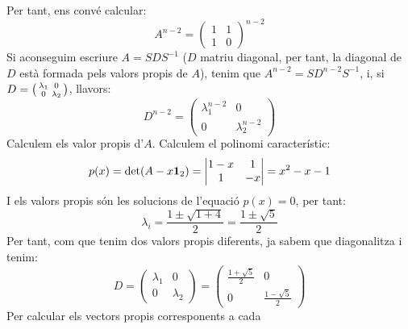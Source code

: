 \documentclass[
  11pt,
]{book}
\numberwithin{dummy}{section}
\theoremstyle{maincolornumbox}
\theoremstyle{blacknumex}
\theoremstyle{blacknumbox}
\theoremstyle{maincolornum}
\newlength\esp
\begin{document}
Per tant, ens convé calcular: \[A^{n-2}=
\begin{pmatrix}
1 & 1\\1 & 0
\end{pmatrix}^{n-2}\] Si aconseguim escriure \(A=SDS^{-1}\) (\(D\) matriu
diagonal, per tant, la diagonal de \(D\) està formada pels valors propis
de \(A\)), tenim que \(A^{n-2}=SD^{n-2}S^{-1}\), i, si
\(D=\left(\begin{smallmatrix}\lambda_1 & 0 \\ 0 & \lambda_2\end{smallmatrix}\right)\), llavors:
\[D^{n-2}=\begin{pmatrix}
\lambda_1^{n-2} & 0 \\ 0 & \lambda_2^{n-2}
\end{pmatrix}\] Calculem els valor propis d'\(A\). Calculem el polinomi
característic: \[p(x)=\det(A-x\mathbf{1}_2)=\begin{vmatrix}
1-x & 1 \\ 1 & -x
\end{vmatrix}= x^2-x-1\] I els valors propis són les solucions de
l'equació \(p(x)=0\), per tant:
\[\lambda_i=\frac{1\pm \sqrt{1+4}}{2}=\frac{1\pm\sqrt{5}}{2}\] Per tant,
com que tenim dos valors propis diferents, ja sabem que diagonalitza i
tenim: \[D=
\begin{pmatrix} \lambda_1 & 0 \\ 0  & \lambda_2
\end{pmatrix}=
\begin{pmatrix}
\frac{1+\sqrt{5}}{2} & 0 \\ 0 & \frac{1-\sqrt{5}}{2}
\end{pmatrix}\] Per calcular els vectors propis corresponents a cada
\end{document}
